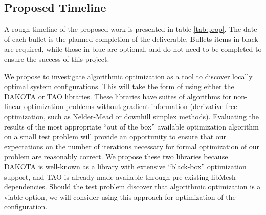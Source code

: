 
\subsection{Proposed Timeline}


%
%
A rough timeline of the proposed work is presented in table
\ref{tab:prop}. The date of each bullet is the planned completion of the
deliverable. Bullets items in black are required, while those in blue
are optional, and do not need to be completed to ensure the
success of this project. 

% 
% 
We propose to investigate algorithmic optimization as a tool to discover
locally optimal system configurations. 
This will take the form of using either the DAKOTA\cite{adams2013dakota}
or TAO\cite{tao-user-ref} libraries. These libraries have suites of
algorithms for non-linear optimization problems without gradient
information (derivative-free optimization, such as Nelder-Mead or downhill simplex methods). 
Evaluating the results of the most
appropriate ``out of the box'' available optimization algorithm on a
small test problem will provide an opportunity to ensure that our
expectations on the number of iterations necessary for formal
optimization of our problem are reasonably correct. 
We propose these two libraries because DAKOTA is well-known as a library
with extensive ``black-box'' optimization support, and TAO is already
made available through pre-existing libMesh dependencies. Should the
test problem discover that algorithmic optimization is a viable option,
we will consider using this approach for optimization of the
configuration. 


